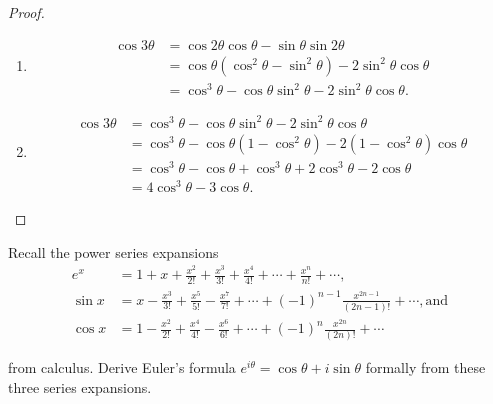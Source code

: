 \begin{proof}
    \begin{enumerate}[topsep=0pt,itemsep=0pt,label={\textbf{\alph*.}}]
        \item \begin{align*}
                  \cos{3\theta} & = \cos{2\theta}\cos{\theta} - \sin{\theta}\sin{2\theta}                             \\
                                & = \cos{\theta}(\cos^{2}{\theta} - \sin^{2}{\theta}) - 2\sin^{2}{\theta}\cos{\theta} \\
                                & = \cos^{3}{\theta} - \cos{\theta}\sin^{2}{\theta} - 2\sin^{2}{\theta}\cos{\theta}.
              \end{align*}
        \item \begin{align*}
                  \cos{3\theta} & = \cos^{3}{\theta} - \cos{\theta}\sin^{2}{\theta} - 2\sin^{2}{\theta}\cos{\theta}             \\
                                & = \cos^{3}{\theta} - \cos{\theta}(1 - \cos^{2}{\theta}) - 2(1 - \cos^{2}{\theta})\cos{\theta} \\
                                & = \cos^{3}{\theta} - \cos{\theta} + \cos^{3}{\theta} + 2\cos^{3}{\theta} - 2\cos{\theta}      \\
                                & = 4\cos^{3}{\theta} - 3\cos{\theta}.
              \end{align*}
    \end{enumerate}
\end{proof}

\begin{exercise}
    Recall the power series expansions
    \begin{align*}
        e^{x}  & = 1 + x + \frac{x^{2}}{2!} + \frac{x^{3}}{3!} + \frac{x^{4}}{4!} + \cdots + \frac{x^{n}}{n!} + \cdots,                            \\
        \sin x & = x - \frac{x^{3}}{3!} + \frac{x^{5}}{5!} - \frac{x^{7}}{7!} + \cdots + {(-1)}^{n-1}\frac{x^{2n-1}}{(2n-1)!} + \cdots, \text{and} \\
        \cos x & = 1 - \frac{x^{2}}{2!} + \frac{x^{4}}{4!} - \frac{x^{6}}{6!} + \cdots + {(-1)}^{n}\frac{x^{2n}}{(2n)!} + \cdots
    \end{align*}

    from calculus. Derive Euler's formula $e^{i\theta} = \cos{\theta} + i\sin{\theta}$ formally from these three series expansions.
\end{exercise}


